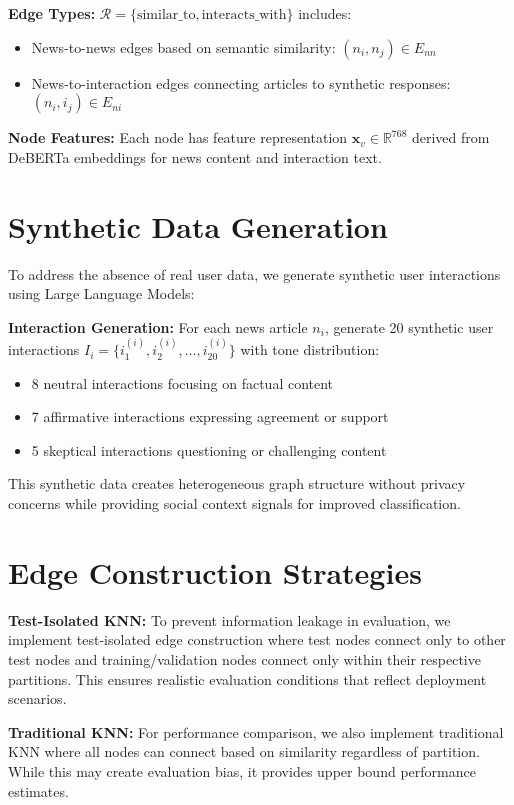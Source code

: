 \textbf{Edge Types:} $\mathcal{R} = \{\text{similar\_to}, \text{interacts\_with}\}$ includes:
\begin{itemize}
\item News-to-news edges based on semantic similarity: $(n_i, n_j) \in E_{nn}$
\item News-to-interaction edges connecting articles to synthetic responses: $(n_i, i_j) \in E_{ni}$
\end{itemize}

\textbf{Node Features:} Each node has feature representation $\mathbf{x}_v \in \mathbb{R}^{768}$ derived from DeBERTa embeddings for news content and interaction text.

\section{Synthetic Data Generation}

To address the absence of real user data, we generate synthetic user interactions using Large Language Models:

\textbf{Interaction Generation:} For each news article $n_i$, generate 20 synthetic user interactions $I_i = \{i_1^{(i)}, i_2^{(i)}, \ldots, i_{20}^{(i)}\}$ with tone distribution:
\begin{itemize}
\item 8 neutral interactions focusing on factual content
\item 7 affirmative interactions expressing agreement or support  
\item 5 skeptical interactions questioning or challenging content
\end{itemize}

This synthetic data creates heterogeneous graph structure without privacy concerns while providing social context signals for improved classification.

\section{Edge Construction Strategies}

\textbf{Test-Isolated KNN:} To prevent information leakage in evaluation, we implement test-isolated edge construction where test nodes connect only to other test nodes and training/validation nodes connect only within their respective partitions. This ensures realistic evaluation conditions that reflect deployment scenarios.

\textbf{Traditional KNN:} For performance comparison, we also implement traditional KNN where all nodes can connect based on similarity regardless of partition. While this may create evaluation bias, it provides upper bound performance estimates.

